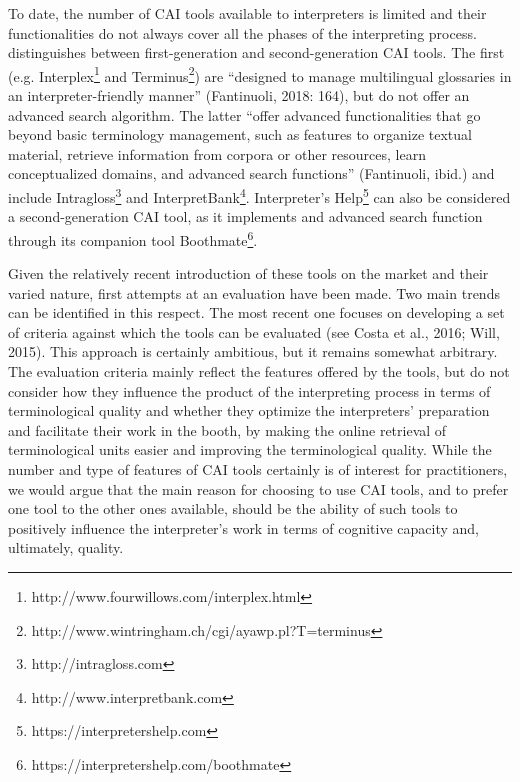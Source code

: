 \documentclass[output=paper]{langsci/langscibook}
\begin{document}
To date, the number of CAI tools available to interpreters is limited and their functionalities do not always cover all the phases of the interpreting process. \citet{Fantinuoli2018} distinguishes between first-generation and second-generation CAI tools. The first (e.g. Interplex\footnote{http://www.fourwillows.com/interplex.html} and Terminus\footnote{http://www.wintringham.ch/cgi/ayawp.pl?T=terminus}) are “designed to manage multilingual glossaries in an interpreter-friendly manner” (Fantinuoli, 2018: 164), but do not offer an advanced search algorithm. The latter “offer advanced functionalities that go beyond basic terminology management, such as features to organize textual material, retrieve information from corpora or other resources, learn conceptualized domains, and advanced search functions” (Fantinuoli, ibid.) and include Intragloss\footnote{http://intragloss.com} and InterpretBank\footnote{http://www.interpretbank.com}. Interpreter’s Help\footnote{https://interpretershelp.com} can also be considered a second-generation CAI tool, as it implements and advanced search function through its companion tool Boothmate\footnote{https://interpretershelp.com/boothmate}. 

Given the relatively recent introduction of these tools on the market and their varied nature, first attempts at an evaluation have been made. Two main trends can be identified in this respect. The most recent one focuses on developing a set of criteria against which the tools can be evaluated (see Costa et al., 2016; Will, 2015). This approach is certainly ambitious, but it remains somewhat arbitrary. The evaluation criteria mainly reflect the features offered by the tools, but do not consider how they influence the product of the interpreting process in terms of terminological quality and whether they optimize the interpreters’ preparation and facilitate their work in the booth, by making the online retrieval of terminological units easier and improving the terminological quality. While the number and type of features of CAI tools certainly is of interest for practitioners, we would argue that the main reason for choosing to use CAI tools, and to prefer one tool to the other ones available, should be the ability of such tools to positively influence the interpreter’s work in terms of cognitive capacity and, ultimately, quality. 
\end{document}
